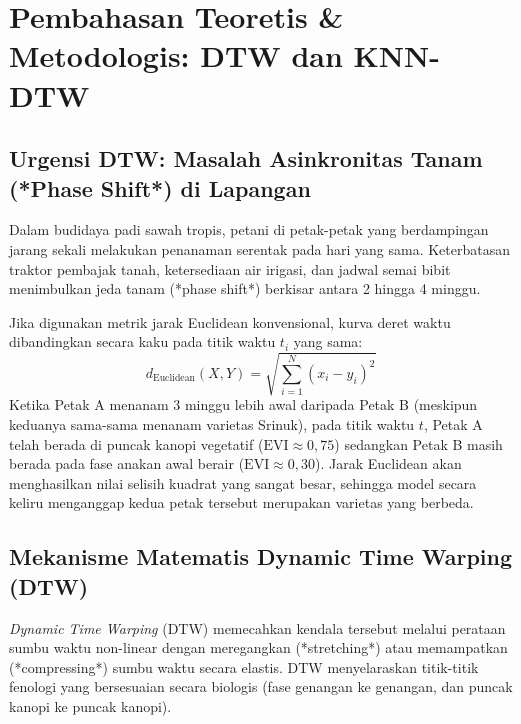 \documentclass[11pt,a4paper]{article}
\begin{document}
\section{Pembahasan Teoretis \& Metodologis: DTW dan KNN-DTW}

\subsection{Urgensi DTW: Masalah Asinkronitas Tanam (*Phase Shift*) di Lapangan}
Dalam budidaya padi sawah tropis, petani di petak-petak yang berdampingan jarang sekali melakukan penanaman serentak pada hari yang sama. Keterbatasan traktor pembajak tanah, ketersediaan air irigasi, dan jadwal semai bibit menimbulkan jeda tanam (*phase shift*) berkisar antara 2 hingga 4 minggu. 

Jika digunakan metrik jarak Euclidean konvensional, kurva deret waktu dibandingkan secara kaku pada titik waktu $t_i$ yang sama:
\begin{equation}
    d_{\text{Euclidean}}(X, Y) = \sqrt{\sum_{i=1}^N (x_i - y_i)^2}
\end{equation}
Ketika Petak A menanam 3 minggu lebih awal daripada Petak B (meskipun keduanya sama-sama menanam varietas Srinuk), pada titik waktu $t$, Petak A telah berada di puncak kanopi vegetatif ($\text{EVI} \approx 0{,}75$) sedangkan Petak B masih berada pada fase anakan awal berair ($\text{EVI} \approx 0{,}30$). Jarak Euclidean akan menghasilkan nilai selisih kuadrat yang sangat besar, sehingga model secara keliru menganggap kedua petak tersebut merupakan varietas yang berbeda.

\subsection{Mekanisme Matematis Dynamic Time Warping (DTW)}
\textit{Dynamic Time Warping} (DTW) memecahkan kendala tersebut melalui perataan sumbu waktu non-linear dengan meregangkan (*stretching*) atau memampatkan (*compressing*) sumbu waktu secara elastis. DTW menyelaraskan titik-titik fenologi yang bersesuaian secara biologis (fase genangan ke genangan, dan puncak kanopi ke puncak kanopi).
\end{document}
